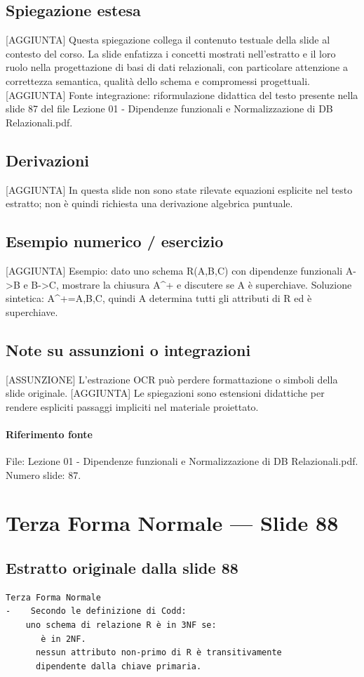 \documentclass[11pt]{article}
\begin{document}
\subsection*{Spiegazione estesa}
[AGGIUNTA] Questa spiegazione collega il contenuto testuale della slide al contesto del corso. La slide enfatizza i concetti mostrati nell'estratto e il loro ruolo nella progettazione di basi di dati relazionali, con particolare attenzione a correttezza semantica, qualità dello schema e compromessi progettuali.
[AGGIUNTA] Fonte integrazione: riformulazione didattica del testo presente nella slide 87 del file Lezione 01 - Dipendenze funzionali e Normalizzazione di DB Relazionali.pdf.
\subsection*{Derivazioni}
[AGGIUNTA] In questa slide non sono state rilevate equazioni esplicite nel testo estratto; non è quindi richiesta una derivazione algebrica puntuale.
\subsection*{Esempio numerico / esercizio}
[AGGIUNTA] Esempio: dato uno schema R(A,B,C) con dipendenze funzionali A->B e B->C, mostrare la chiusura A^+ e discutere se A è superchiave. Soluzione sintetica: A^+={A,B,C}, quindi A determina tutti gli attributi di R ed è superchiave.
\subsection*{Note su assunzioni o integrazioni}
[ASSUNZIONE] L'estrazione OCR può perdere formattazione o simboli della slide originale.
[AGGIUNTA] Le spiegazioni sono estensioni didattiche per rendere espliciti passaggi impliciti nel materiale proiettato.
\paragraph{Riferimento fonte} File: Lezione 01 - Dipendenze funzionali e Normalizzazione di DB Relazionali.pdf. Numero slide: 87.
\section{Terza Forma Normale --- Slide 88}
\subsection*{Estratto originale dalla slide 88}
\begin{lstlisting}
Terza Forma Normale
-    Secondo le definizione di Codd:
    uno schema di relazione R è in 3NF se:
       è in 2NF.
      nessun attributo non-primo di R è transitivamente
      dipendente dalla chiave primaria.
\end{lstlisting}
\end{document}
